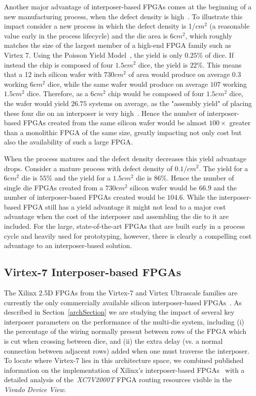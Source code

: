 \documentclass[journal]{IEEEtran}
\begin{document}
Another major advantage of interposer-based FPGAs comes at the beginning of a new manufacturing process, when the defect density is high~\cite{xilinxTSVperformance}. To illustrate this impact consider a new process in which the defect density is 1/$cm^2$ (a reasonable value early in the process lifecycle) and the die area is $6cm^2$, which roughly matches the size of the largest member of a high-end FPGA family such as Virtex 7. Using the Poisson Yield Model~\cite{yieldmodel}, the yield is only $0.25\%$ of dice. If instead the chip is composed of four $1.5cm^2$ dice, the yield is $22\%$. This means that a 12 inch silicon wafer with $730cm^2$ of area would produce on average $0.3$ working $6cm^2$ dice, while the same wafer would produce on average $107$ working $1.5cm^2$ dice. Therefore, as a $6cm^2$ chip would be composed of four $1.5cm^2$ dice, the wafer would yield $26.75$ systems on average, as the "assembly yield" of placing these four die on an interposer is very high~\cite{xilinxTSV}. Hence the number of interposer-based FPGAs created from the same silicon wafer would be almost $100\times$ greater than a monolithic FPGA of the same size, greatly impacting not only cost but also the availability of such a large FPGA.

When the process matures and the defect density decreases this yield advantage drops. Consider a mature process with defect density of $0.1/cm^2$. The yield for a $6cm^2$ die is $55\%$ and the yield for a $1.5cm^2$ die is $86\%$. Hence the number of single die FPGAs created from a $730cm^2$ silicon wafer would be $66.9$ and the number of interposer-based FPGAs created would be $104.6$. While the interposer-based FPGA still has a yield advantage it might not lead to a major cost advantage when the cost of the interposer and assembling the die to it are included. For the large, state-of-the-art FPGAs that are built early in a process cycle and heavily used for prototyping, however, there is clearly a compelling cost advantage to an interposer-based solution.

\subsection{Virtex-7 Interposer-based FPGAs}
\label{virtex7section}

The Xilinx 2.5D FPGAs from the Virtex-7 and Virtex Ultrascale families are currently the only commercially available silicon interposer-based FPGAs~\cite{xilinxWP}. As described in Section~\ref{archSection} we are studying the impact of several key interposer parameters on the performance of the multi-die system, including (i) the percentage of the wiring normally present between rows of the FPGA which is cut when crossing between dice, and (ii) the extra delay (vs. a normal connection between adjacent rows) added when one must traverse the interposer.  To locate where Virtex-7 lies in this architecture space, we combined published information on the implementation of Xilinx's interposer-based FPGAs~\cite{xilinxTSV} with a detailed analysis of the~\textit{XC7V2000T} FPGA routing resources visible in the \textit{Vivado Device View}.
\end{document}
